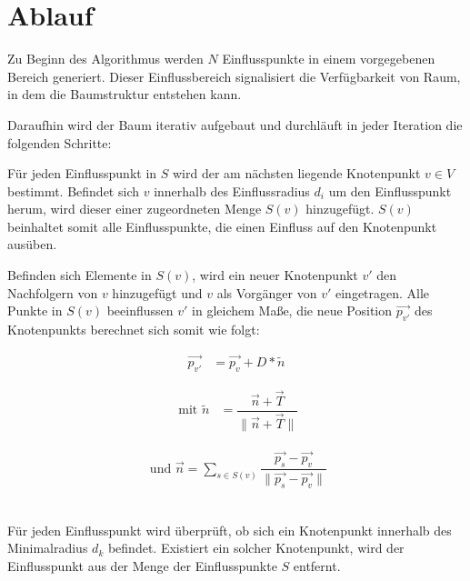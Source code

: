 \section{Ablauf}
\label{sec:SCA_Ablauf}
Zu Beginn des Algorithmus werden $N$ Einflusspunkte in einem vorgegebenen Bereich generiert. Dieser Einflussbereich signalisiert die Verfügbarkeit von Raum, in dem die Baumstruktur entstehen kann.  \cite[Abschn. 2]{SpaceColonizationAlgorithm:07}

Daraufhin wird der Baum iterativ aufgebaut und durchläuft in jeder Iteration die folgenden Schritte: 

\begin{description}[labelindent]
	\item[\boldmath$1.$] Für jeden Einflusspunkt in $S$ wird der am nächsten liegende Knotenpunkt $v\in V$ bestimmt. Befindet sich $v$ innerhalb des Einflussradius $d_i$ um den Einflusspunkt herum, wird dieser einer zugeordneten Menge $S(v)$ hinzugefügt. $S(v)$ beinhaltet somit alle Einflusspunkte, die einen Einfluss auf den Knotenpunkt ausüben. \cite[Abschn. 2]{SpaceColonizationAlgorithm:07} \label{alg:SCA_1}\\
	
	\item[\boldmath$2.$] Befinden sich Elemente in $S(v)$, wird ein neuer Knotenpunkt $v'$ den Nachfolgern von $v$ hinzugefügt und $v$ als Vorgänger von $v'$ eingetragen.  Alle Punkte in $S(v)$ beeinflussen $v'$ in gleichem Maße, die neue Position $\overrightarrow{p_{v'}}$ des Knotenpunkts berechnet sich somit wie folgt:
	
	\begin{equation}
	\begin{array}{ll}
	\overrightarrow{p_{v'}} & = \overrightarrow{p_v} + D * \tilde{n}
	\end{array}
	\end{equation} 
	
	\begin{equation}
	\begin{array}{ll}
	\text{  mit  } \tilde{n} & = \dfrac{\overrightarrow{n} + \overrightarrow{T} }{\lVert\overrightarrow{n} + \overrightarrow{T}\rVert}  
	\end{array}
	\end{equation} 
	
	\begin{equation}
	\begin{array}{ll}
	\text{ und }  \overrightarrow{n} = \sum\limits_{s \in S(v)}\dfrac{\overrightarrow{p_s} - \overrightarrow{p_v}}{\lVert \overrightarrow{p_s} - \overrightarrow{p_v} \rVert}
	\end{array}
	\end{equation}	
	\cite[Abschn. 2]{SpaceColonizationAlgorithm:07} \label{alg:SCA_2}\\
	
	\item[\boldmath$3.$] Für jeden Einflusspunkt wird überprüft, ob sich ein Knotenpunkt innerhalb des Minimalradius $d_k$ befindet. Existiert ein solcher Knotenpunkt, wird der Einflusspunkt aus der Menge der Einflusspunkte $S$ entfernt. \cite[Abschn. 2]{SpaceColonizationAlgorithm:07} \label{alg:SCA_3}
\end{description}

